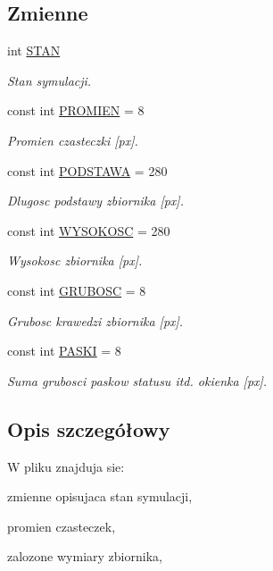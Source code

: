 \subsection*{Zmienne}
\begin{DoxyCompactItemize}
\item 
int \hyperlink{flagi_8hh_ae3a120c63186a17e4127a68187b3e9e8}{S\+T\+A\+N}
\begin{DoxyCompactList}\small\item\em Stan symulacji. \end{DoxyCompactList}\item 
const int \hyperlink{flagi_8hh_aa77f856f3142a9e81752665a9bc2e6de}{P\+R\+O\+M\+I\+E\+N} = 8
\begin{DoxyCompactList}\small\item\em Promien czasteczki \mbox{[}px\mbox{]}. \end{DoxyCompactList}\item 
const int \hyperlink{flagi_8hh_acd3c5814c051e565bf7854f6403acf49}{P\+O\+D\+S\+T\+A\+W\+A} = 280
\begin{DoxyCompactList}\small\item\em Dlugosc podstawy zbiornika \mbox{[}px\mbox{]}. \end{DoxyCompactList}\item 
const int \hyperlink{flagi_8hh_a073767f0ac7dbf009a42b00de1092b52}{W\+Y\+S\+O\+K\+O\+S\+C} = 280
\begin{DoxyCompactList}\small\item\em Wysokosc zbiornika \mbox{[}px\mbox{]}. \end{DoxyCompactList}\item 
const int \hyperlink{flagi_8hh_a359a95636f17b8e9b7a01389d75b521d}{G\+R\+U\+B\+O\+S\+C} = 8
\begin{DoxyCompactList}\small\item\em Grubosc krawedzi zbiornika \mbox{[}px\mbox{]}. \end{DoxyCompactList}\item 
const int \hyperlink{flagi_8hh_afa380d01dc08ee237b4eea9046704397}{P\+A\+S\+K\+I} = 8
\begin{DoxyCompactList}\small\item\em Suma grubosci paskow statusu itd. okienka \mbox{[}px\mbox{]}. \end{DoxyCompactList}\end{DoxyCompactItemize}


\subsection{Opis szczegółowy}
W pliku znajduja sie\+:
\begin{DoxyItemize}
\item zmienne opisujaca stan symulacji,
\item promien czasteczek,
\item zalozone wymiary zbiornika, 
\end{DoxyItemize}

